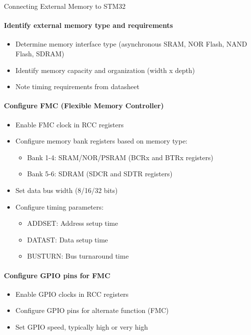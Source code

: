 \begin{KR}{Connecting External Memory to STM32}
\paragraph{Identify external memory type and requirements}
\begin{itemize}
    \item Determine memory interface type (asynchronous SRAM, NOR Flash, NAND Flash, SDRAM)
    \item Identify memory capacity and organization (width x depth)
    \item Note timing requirements from datasheet
\end{itemize}

\paragraph{Configure FMC (Flexible Memory Controller)}
\begin{itemize}
    \item Enable FMC clock in RCC registers
    \item Configure memory bank registers based on memory type:
    \begin{itemize}
        \item Bank 1-4: SRAM/NOR/PSRAM (BCRx and BTRx registers)
        \item Bank 5-6: SDRAM (SDCR and SDTR registers)
    \end{itemize}
    \item Set data bus width (8/16/32 bits)
    \item Configure timing parameters:
    \begin{itemize}
        \item ADDSET: Address setup time
        \item DATAST: Data setup time
        \item BUSTURN: Bus turnaround time
    \end{itemize}
\end{itemize}

\paragraph{Configure GPIO pins for FMC}
\begin{itemize}
    \item Enable GPIO clocks in RCC registers
    \item Configure GPIO pins for alternate function (FMC)
    \item Set GPIO speed, typically high or very high
\end{itemize}


\end{KR}
